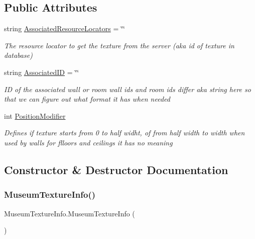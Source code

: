 \subsection*{Public Attributes}
\begin{DoxyCompactItemize}
\item 
string \mbox{\hyperlink{class_museum_texture_info_ae24092193557d3775c07762acb158adc}{Associated\+Resource\+Locators}} = \char`\"{}\char`\"{}
\begin{DoxyCompactList}\small\item\em The resource locator to get the texture from the server (aka id of texture in database) \end{DoxyCompactList}\item 
string \mbox{\hyperlink{class_museum_texture_info_a31425831c498a46842b2cce06e629183}{Associated\+ID}} = \char`\"{}\char`\"{}
\begin{DoxyCompactList}\small\item\em ID of the associated wall or room wall ids and room ids differ aka string here so that we can figure out what format it has when needed \end{DoxyCompactList}\item 
int \mbox{\hyperlink{class_museum_texture_info_aaa15a48a616e6212ead2dd506f452974}{Position\+Modifier}}
\begin{DoxyCompactList}\small\item\em Defines if texture starts from 0 to half widht, of from half width to width when used by walls for flloors and ceilings it has no meaning \end{DoxyCompactList}\end{DoxyCompactItemize}


\subsection{Constructor \& Destructor Documentation}
\mbox{\label{class_museum_texture_info_a930fdf9cdf96752c649660bed901178f}} 
\subsubsection{\texorpdfstring{Museum\+Texture\+Info()}{MuseumTextureInfo()}}
{\footnotesize\ttfamily Museum\+Texture\+Info.\+Museum\+Texture\+Info (\begin{DoxyParamCaption}{ }\end{DoxyParamCaption})}



